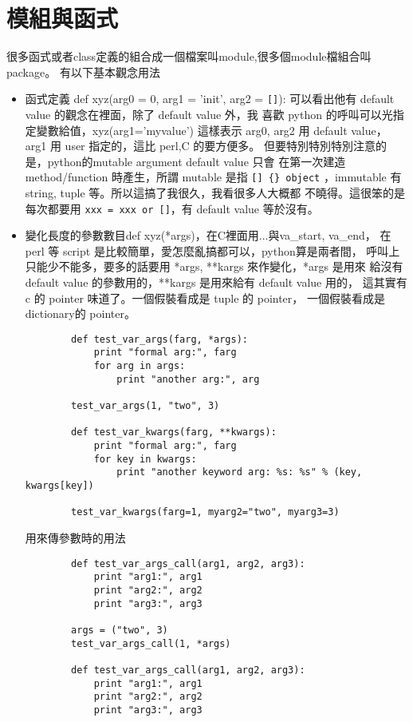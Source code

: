\section{模組與函式}
很多函式或者class定義的組合成一個檔案叫module,很多個module檔組合叫package。
有以下基本觀念用法
\begin{itemize}
\item 函式定義 def xyz(arg0 = 0, arg1 = 'init', arg2 = \verb=[]=):
	可以看出他有 default value 的觀念在裡面，除了 default value 外，我
	喜歡 python 的呼叫可以光指定變數給值，xyz(arg1='myvalue') 這樣表示 arg0,
	arg2 用 default value，arg1 用 user 指定的，這比 perl,C 的要方便多。
        但要特別特別特別注意的是，python的mutable argument default value 只會
        在第一次建造 method/function 時產生，所謂 mutable 是指 \verb=[] {} object=
        ，immutable 有 string, tuple 等。所以這搞了我很久，我看很多人大概都
        不曉得。這很笨的是每次都要用 \verb|xxx = xxx or []|，有 default value
        等於沒有。
\item 變化長度的參數數目def xyz(*args)，在C裡面用...與va\_start, va\_end，
	在 perl 等 script 是比較簡單，愛怎麼亂搞都可以，python算是兩者間，
	呼叫上只能少不能多，要多的話要用 *args, **kargs 來作變化，*args 是用來
	給沒有 default value 的參數用的，**kargs 是用來給有 default value 用的，
	這其實有 c 的 pointer 味道了。一個假裝看成是 tuple 的 pointer，
        一個假裝看成是 dictionary的 pointer。
        \begin{verbatim}
        def test_var_args(farg, *args):
            print "formal arg:", farg
            for arg in args:
                print "another arg:", arg

        test_var_args(1, "two", 3)

        def test_var_kwargs(farg, **kwargs):
            print "formal arg:", farg
            for key in kwargs:
                print "another keyword arg: %s: %s" % (key, kwargs[key])

        test_var_kwargs(farg=1, myarg2="two", myarg3=3)
        \end{verbatim}
	用來傳參數時的用法
        \begin{verbatim}
        def test_var_args_call(arg1, arg2, arg3):
            print "arg1:", arg1
            print "arg2:", arg2
            print "arg3:", arg3

        args = ("two", 3)
        test_var_args_call(1, *args)

        def test_var_args_call(arg1, arg2, arg3):
            print "arg1:", arg1
            print "arg2:", arg2
            print "arg3:", arg3


\end{verbatim}
\end{itemize}
